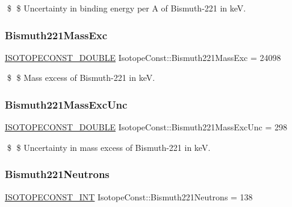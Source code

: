 \$ \$ Uncertainty in binding energy per A of Bismuth-\/221 in keV. \mbox{\label{group___isotope_const-_bismuth-_bi221_gabf71f4cecc6c691853cd542c7e89d1b0}} 
\subsubsection{\texorpdfstring{Bismuth221\+Mass\+Exc}{Bismuth221MassExc}}
{\footnotesize\ttfamily \mbox{\hyperlink{group___isotope_const-_macros_ga8f45a7272ce02c0b4c65c44636ed719a}{I\+S\+O\+T\+O\+P\+E\+C\+O\+N\+S\+T\+\_\+\+D\+O\+U\+B\+LE}} Isotope\+Const\+::\+Bismuth221\+Mass\+Exc = 24098}

\$ \$ Mass excess of Bismuth-\/221 in keV. \mbox{\label{group___isotope_const-_bismuth-_bi221_ga3de2687f79fcffede355dc44d2e7054c}} 
\subsubsection{\texorpdfstring{Bismuth221\+Mass\+Exc\+Unc}{Bismuth221MassExcUnc}}
{\footnotesize\ttfamily \mbox{\hyperlink{group___isotope_const-_macros_ga8f45a7272ce02c0b4c65c44636ed719a}{I\+S\+O\+T\+O\+P\+E\+C\+O\+N\+S\+T\+\_\+\+D\+O\+U\+B\+LE}} Isotope\+Const\+::\+Bismuth221\+Mass\+Exc\+Unc = 298}

\$ \$ Uncertainty in mass excess of Bismuth-\/221 in keV. \mbox{\label{group___isotope_const-_bismuth-_bi221_ga766c9655ce5be275103fcbb0243ab4f4}} 
\subsubsection{\texorpdfstring{Bismuth221\+Neutrons}{Bismuth221Neutrons}}
{\footnotesize\ttfamily \mbox{\hyperlink{group___isotope_const-_macros_ga5f18360b3e99483a35c32d789e62621c}{I\+S\+O\+T\+O\+P\+E\+C\+O\+N\+S\+T\+\_\+\+I\+NT}} Isotope\+Const\+::\+Bismuth221\+Neutrons = 138}

